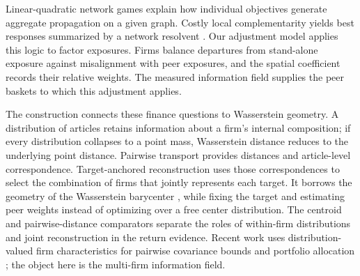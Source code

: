Linear-quadratic network games explain how individual objectives generate
aggregate propagation on a given graph.
Costly local complementarity yields best responses summarized by a network
resolvent \citep{ballester_networks_2006}.
Our adjustment model applies this logic to factor exposures.
Firms balance departures from stand-alone exposure against misalignment with
peer exposures, and the spatial coefficient records their relative weights.
The measured information field supplies the peer baskets to which this
adjustment applies.

The construction connects these finance questions to Wasserstein geometry.
A distribution of articles retains information about a firm's internal
composition; if every distribution collapses to a point mass, Wasserstein
distance reduces to the underlying point distance.
Pairwise transport provides distances and article-level correspondence.
Target-anchored reconstruction uses those correspondences to select the
combination of firms that jointly represents each target.
It borrows the geometry of the Wasserstein barycenter
\citep{agueh_carlier_barycenters_2011}, while fixing the target and estimating
peer weights instead of optimizing over a free center distribution.
The centroid and pairwise-distance comparators separate the roles of
within-firm distributions and joint reconstruction in the return evidence.
Recent work uses distribution-valued firm characteristics for pairwise
covariance bounds \citep{gawronsky_continuous_2026} and portfolio allocation
\citep{gawronsky_distance_mpt_2026}; the object here is the multi-firm
information field.
